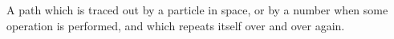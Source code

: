 A path which is traced out by a particle in space, or by
a number when some operation is performed, and which repeats
itself over and over again.